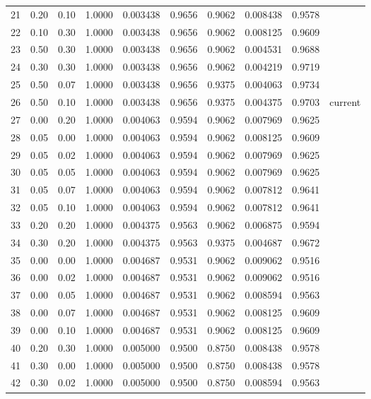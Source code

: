 \begin{tabular}{r r r r r r r r r l}
21 & 0.20 & 0.10 & 1.0000 & 0.003438 & 0.9656 & 0.9062 & 0.008438 & 0.9578 &  \\
22 & 0.10 & 0.30 & 1.0000 & 0.003438 & 0.9656 & 0.9062 & 0.008125 & 0.9609 &  \\
23 & 0.50 & 0.30 & 1.0000 & 0.003438 & 0.9656 & 0.9062 & 0.004531 & 0.9688 &  \\
24 & 0.30 & 0.30 & 1.0000 & 0.003438 & 0.9656 & 0.9062 & 0.004219 & 0.9719 &  \\
25 & 0.50 & 0.07 & 1.0000 & 0.003438 & 0.9656 & 0.9375 & 0.004063 & 0.9734 &  \\
26 & 0.50 & 0.10 & 1.0000 & 0.003438 & 0.9656 & 0.9375 & 0.004375 & 0.9703 & current \\
27 & 0.00 & 0.20 & 1.0000 & 0.004063 & 0.9594 & 0.9062 & 0.007969 & 0.9625 &  \\
28 & 0.05 & 0.00 & 1.0000 & 0.004063 & 0.9594 & 0.9062 & 0.008125 & 0.9609 &  \\
29 & 0.05 & 0.02 & 1.0000 & 0.004063 & 0.9594 & 0.9062 & 0.007969 & 0.9625 &  \\
30 & 0.05 & 0.05 & 1.0000 & 0.004063 & 0.9594 & 0.9062 & 0.007969 & 0.9625 &  \\
31 & 0.05 & 0.07 & 1.0000 & 0.004063 & 0.9594 & 0.9062 & 0.007812 & 0.9641 &  \\
32 & 0.05 & 0.10 & 1.0000 & 0.004063 & 0.9594 & 0.9062 & 0.007812 & 0.9641 &  \\
33 & 0.20 & 0.20 & 1.0000 & 0.004375 & 0.9563 & 0.9062 & 0.006875 & 0.9594 &  \\
34 & 0.30 & 0.20 & 1.0000 & 0.004375 & 0.9563 & 0.9375 & 0.004687 & 0.9672 &  \\
35 & 0.00 & 0.00 & 1.0000 & 0.004687 & 0.9531 & 0.9062 & 0.009062 & 0.9516 &  \\
36 & 0.00 & 0.02 & 1.0000 & 0.004687 & 0.9531 & 0.9062 & 0.009062 & 0.9516 &  \\
37 & 0.00 & 0.05 & 1.0000 & 0.004687 & 0.9531 & 0.9062 & 0.008594 & 0.9563 &  \\
38 & 0.00 & 0.07 & 1.0000 & 0.004687 & 0.9531 & 0.9062 & 0.008125 & 0.9609 &  \\
39 & 0.00 & 0.10 & 1.0000 & 0.004687 & 0.9531 & 0.9062 & 0.008125 & 0.9609 &  \\
40 & 0.20 & 0.30 & 1.0000 & 0.005000 & 0.9500 & 0.8750 & 0.008438 & 0.9578 &  \\
41 & 0.30 & 0.00 & 1.0000 & 0.005000 & 0.9500 & 0.8750 & 0.008438 & 0.9578 &  \\
42 & 0.30 & 0.02 & 1.0000 & 0.005000 & 0.9500 & 0.8750 & 0.008594 & 0.9563 &  \\

\end{tabular}
